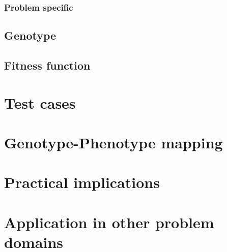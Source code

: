 \documentclass[12pt]{article}
\begin{document}
		\subsubsection{Problem specific}
		
	\subsection{Genotype}\label{sec:geno}
	\subsection{Fitness function}\label{sec:fitness}
\section{Test cases}\label{sec:test}
\section{Genotype-Phenotype mapping}\label{sec:mapping}
\section{Practical implications}\label{sec:implications}
\section{Application in other problem domains}\label{sec:applications}
\end{document}
